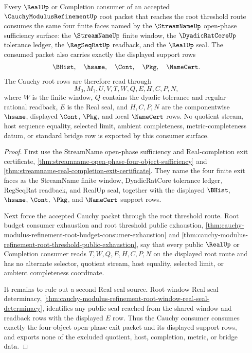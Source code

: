 \begin{theorem}
\label{thm:cauchy-modulus-refinement-open-phase-four-object-consumption}
Every $\RealUp$ or Completion consumer of an accepted $\CauchyModulusRefinementUp$ root packet that reaches the root threshold route consumes the same four finite faces named by the $\StreamNameUp$ open-phase sufficiency surface: the $\StreamNameUp$ finite window, the $\DyadicRatCoreUp$ tolerance ledger, the $\RegSeqRatUp$ readback, and the $\RealUp$ seal. The consumed packet also carries exactly the displayed support rows
$$
\BHist,\quad \hsame,\quad \Cont,\quad \Pkg,\quad \NameCert.
$$
The Cauchy root rows are therefore read through
$$
M_0,M_1,U,V,T,W,Q,E,H,C,P,N,
$$
where $W$ is the finite window, $Q$ contains the dyadic tolerance and regular-rational readback, $E$ is the Real seal, and $H,C,P,N$ are the componentwise $\hsame$, displayed $\Cont$, $\Pkg$, and local $\NameCert$ rows. No quotient stream, host sequence equality, selected limit, ambient completeness, metric-completeness datum, or standard bridge row is exported by this consumer surface.
\end{theorem}
\begin{proof}
First use the StreamName open-phase sufficiency and Real-completion exit certificate, \autoref{thm:streamname-open-phase-four-object-sufficiency} and \autoref{thm:streamname-real-completion-exit-certificate}. They name the four finite exit faces as the StreamName finite window, DyadicRatCore tolerance ledger, RegSeqRat readback, and RealUp seal, together with the displayed $\BHist$, $\hsame$, $\Cont$, $\Pkg$, and $\NameCert$ support rows.

Next force the accepted Cauchy packet through the root threshold route. Root budget consumer exhaustion and root threshold public exhaustion, \autoref{thm:cauchy-modulus-refinement-root-budget-consumer-exhaustion} and \autoref{thm:cauchy-modulus-refinement-root-threshold-public-exhaustion}, say that every public $\RealUp$ or Completion consumer reads $T,W,Q,E,H,C,P,N$ on the displayed root route and has no alternate selector, quotient stream, host equality, selected limit, or ambient completeness coordinate.

It remains to rule out a second Real seal source. Root-window Real seal determinacy, \autoref{thm:cauchy-modulus-refinement-root-window-real-seal-determinacy}, identifies any public seal reached from the shared window and readback rows with the displayed $E$ row. Thus the Cauchy consumer consumes exactly the four-object open-phase exit packet and its displayed support rows, and exports none of the excluded quotient, host, completion, metric, or bridge data.
\end{proof}

